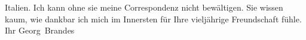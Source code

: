 \begin{ledgroupsized}[t]{13cm}
                        Italien. Ich kann ohne sie meine
                    Correspondenz nicht bewältigen.\pend
           \pstart
           Sie wissen kaum, wie dankbar ich mich im Innersten für Ihre vieljährige
                    Freundschaft fühle.\pend
           \pstart Ihr \spacefill\mbox{Georg Brandes}\pend{}\endnumbering{}\end{ledgroupsized}  \newcommand{\dateiname}{L02443}\newcommand{\titel}{Georg Brandes an Arthur Schnitzler, 21. 6. 1925}\newcommand{\editorInnen}{Martin Anton Müller und Gerd-Hermann Susen}
      